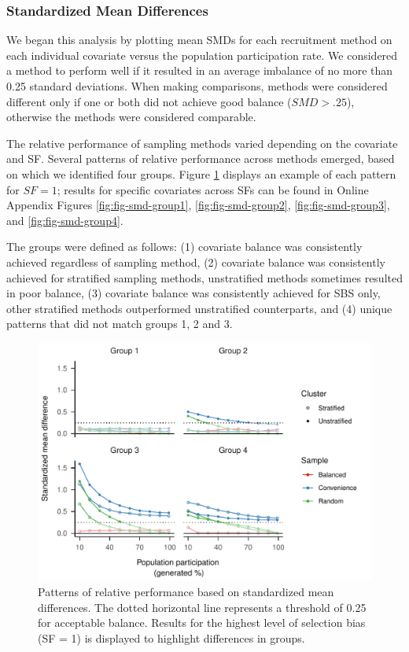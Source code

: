 \documentclass[
  english,
  man,floatsintext]{apa6}
\begin{document}
\hypertarget{standardized-mean-differences}{%
\subsubsection{Standardized Mean Differences}\label{standardized-mean-differences}}

We began this analysis by plotting mean SMDs for each recruitment method on each individual covariate versus the population participation rate. We considered a method to perform well if it resulted in an average imbalance of no more than 0.25 standard deviations. When making comparisons, methods were considered different only if one or both did not achieve good balance (\(SMD > .25\)), otherwise the methods were considered comparable.

The relative performance of sampling methods varied depending on the covariate and SF. Several patterns of relative performance across methods emerged, based on which we identified four groups. Figure \ref{fig:fig-SMD-groups} displays an example of each pattern for \(SF = 1\); results for specific covariates across SFs can be found in Online Appendix Figures \ref{fig:fig-smd-group1}, \ref{fig:fig-smd-group2}, \ref{fig:fig-smd-group3}, and \ref{fig:fig-smd-group4}.

The groups were defined as follows:
(1) covariate balance was consistently achieved regardless of sampling method,
(2) covariate balance was consistently achieved for stratified sampling methods, unstratified methods sometimes resulted in poor balance,
(3) covariate balance was consistently achieved for SBS only, other stratified methods outperformed unstratified counterparts,
and (4) unique patterns that did not match groups 1, 2 and 3.



\begin{figure}
\centering
\includegraphics{6---Paper_files/figure-latex/fig-SMD-groups-1.pdf}
\caption{\label{fig:fig-SMD-groups}Patterns of relative performance based on standardized mean differences. The dotted horizontal line represents a threshold of 0.25 for acceptable balance. Results for the highest level of selection bias (SF = 1) is displayed to highlight differences in groups.}
\end{figure}
\end{document}
